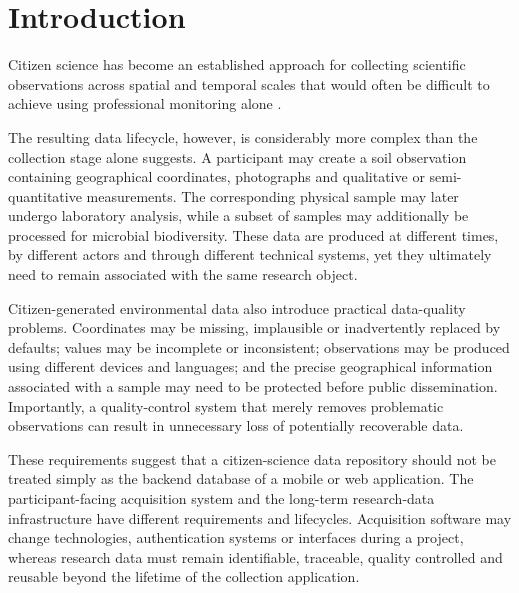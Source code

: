 \section{Introduction}

Citizen science has become an established approach for collecting
scientific observations across spatial and temporal scales that would
often be difficult to achieve using professional monitoring alone
\parencite{bonney2009citizenscience,bonney2014nextsteps}.

The resulting data lifecycle, however, is considerably more complex than the collection stage alone suggests. A participant may create a soil observation containing geographical coordinates, photographs and qualitative or semi-quantitative measurements. The corresponding physical sample may later undergo laboratory analysis, while a subset of samples may additionally be processed for microbial biodiversity. These data are produced at different times, by different actors and through different technical systems, yet they ultimately need to remain associated with the same research object.

Citizen-generated environmental data also introduce practical data-quality problems. Coordinates may be missing, implausible or inadvertently replaced by defaults; values may be incomplete or inconsistent; observations may be produced using different devices and languages; and the precise geographical information associated with a sample may need to be protected before public dissemination. Importantly, a quality-control system that merely removes problematic observations can result in unnecessary loss of potentially recoverable data.

These requirements suggest that a citizen-science data repository should not be treated simply as the backend database of a mobile or web application. The participant-facing acquisition system and the long-term research-data infrastructure have different requirements and lifecycles. Acquisition software may change technologies, authentication systems or interfaces during a project, whereas research data must remain identifiable, traceable, quality controlled and reusable beyond the lifetime of the collection application.

